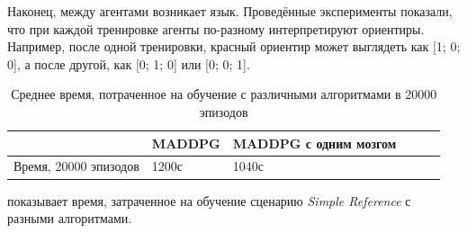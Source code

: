 Наконец, между агентами возникает язык. Проведённые эксперименты показали, что при каждой тренировке агенты по-разному интерпретируют ориентиры. Например, после одной тренировки, красный ориентир может выглядеть как [1; 0; 0], а после другой, как [0; 1; 0] или [0; 0; 1].

\begin{table}[t!]
	\centering\small
	\caption{Среднее время, потраченное на обучение с различными алгоритмами в 20000 эпизодов}
	\label{tab-sr-time}
	\begin{tabular}{|l|l|l|l|l|l|}
		\hline
		&MADDPG&MADDPG с одним мозгом\\
		\hline
		Время, 20000 эпизодов&1200с&1040с\\ \hline
	\end{tabular}
	\normalsize%
\end{table}

 показывает время, затраченное на обучение сценарию \textit{Simple Reference} с разными алгоритмами.